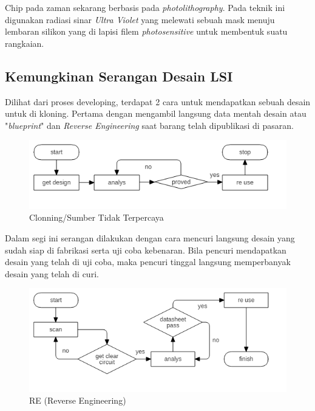 Chip pada zaman sekarang berbasis pada \textit{photolithography}. Pada teknik ini digunakan radiasi sinar \textit{Ultra Violet} yang melewati sebuah mask menuju lembaran silikon yang di lapisi filem \textit{photosensitive} untuk membentuk suatu rangkaian.

% 

\subsection{Kemungkinan Serangan Desain LSI}
Dilihat dari proses developing, terdapat 2 cara untuk mendapatkan sebuah desain untuk di kloning. Pertama dengan mengambil langsung data mentah desain atau "\textit{blueprint}" dan \textit{Reverse Engineering} saat barang telah dipublikasi di pasaran.

\begin{figure}
	\centering
	\includegraphics[width=1.05\textwidth]
	{diagrams/untrustSource.png}
	\caption{Clonning/Sumber Tidak Terpercaya}
	\label{fig:untrustsource}
\end{figure}

Dalam segi ini serangan dilakukan dengan cara mencuri langsung desain yang sudah siap di fabrikasi serta uji coba kebenaran. Bila pencuri mendapatkan desain yang telah di uji coba, maka pencuri tinggal langsung memperbanyak desain yang telah di curi.

\begin{figure}
	\centering
	\includegraphics[width=1.05\textwidth]
	{diagrams/reverseEngineering.png}
	\caption{RE (Reverse Engineering)}
	\label{fig:reverseengineering}
\end{figure}

